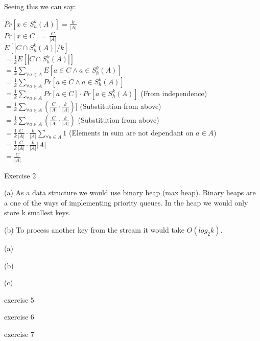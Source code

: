 \documentclass[12pt]{article}
\begin{document}
Seeing this we can say:

$Pr[x \in S_h^k(A)] = \frac{k}{|A|} $ \\
$Pr[x \in C] = \frac{C}{|A|} $\\

$  E[|C \cap S_h^k(A)|/k] $ \\
$= \frac{1}{k} E[|C \cap S_h^k(A)|] $ \\
$= \frac{1}{k}  \sum_{\forall a \in A}  E[a \in C \wedge a \in S_h^k(A)] $ \\
$= \frac{1}{k}  \sum_{\forall a \in A}  Pr[a \in C \wedge a \in S_h^k(A)] $ \\
$= \frac{1}{k}  \sum_{\forall a \in A}  Pr[a \in C] \cdot Pr[a \in S_h^k(A)] $ 				\hfill	(From independence)\\
$= \frac{1}{k}  \sum_{\forall a \in A}  (\frac{C}{|A|} \cdot \frac{k}{|A|} )] $ 			\hfill	(Substitution from above)\\
$= \frac{1}{k}  \sum_{\forall a \in A}  (\frac{C}{|A|} \cdot \frac{k}{|A|} ) $ 			\hfill	(Substitution from above)\\
$= \frac{1}{k} \frac{C}{|A|} \cdot \frac{k}{|A|} \sum_{\forall a \in A}  1 $ 			\hfill	(Elements in sum are not dependant on $a \in A$)\\
$= \frac{1}{k} \frac{C}{|A|} \cdot \frac{k}{|A|} |A| $ 			\hfill	\\
$= \frac{C}{|A|} $ 			\hfill	\\


Exercise 2

(a) As a data structure we would use binary heap (max heap). Binary heaps are a one of the ways of implementing priority queues. In the heap we would only store k smallest keys.

(b) To process another key from the stream it would take $ O(log_2 k)$.


(a)

(b)

(c)



exercise 5


exercise 6

exercise 7
\end{document}
